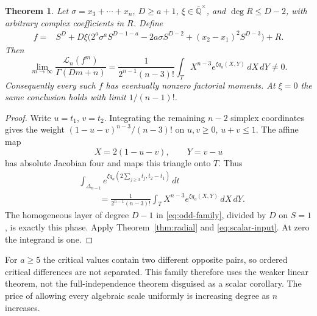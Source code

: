 \documentclass[11pt]{article}
\numberwithin{equation}{section}
\newtheorem{theorem}{Theorem}[section]
\theoremstyle{definition}
\theoremstyle{remark}
\newcommand{\Qbar}{\overline{\mathbb Q}}
\newcommand{\Lcal}{\mathcal L}
\begin{document}
\begin{theorem}\label{thm:odd-family}
Let $\sigma=x_3+\cdots+x_n$, $D\ge a+1$, $\xi\in\Qbar^\times$, and
$\deg R\le D-2$, with arbitrary complex coefficients in $R$. Define
\begin{align}\label{eq:odd-family}
 f={}&S^D+D\xi\bigl(
 2^a\sigma^a S^{D-1-a}
 -2a\sigma S^{D-2}
 +(x_2-x_1)^2 S^{D-3}\bigr)+R.
\end{align}
Then
\[
 \lim_{m\to\infty}\frac{\Lcal_n(f^m)}{\Gamma(Dm+n)}
 =\frac{1}{2^{n-1}(n-3)!}
   \int_T X^{n-3}e^{\xi q_a(X,Y)}\,dX\,dY\ne0.
\]
Consequently every such $f$ has eventually nonzero factorial moments.
At $\xi=0$ the same conclusion holds with limit $1/(n-1)!$.
\end{theorem}
\begin{proof}
Write $u=t_1$, $v=t_2$. Integrating the remaining $n-2$ simplex coordinates
gives the weight $(1-u-v)^{n-3}/(n-3)!$ on
$u,v\ge0$, $u+v\le1$. The affine map
\[
 X=2(1-u-v),\qquad Y=v-u
\]
has absolute Jacobian four and maps this triangle onto $T$. Thus
\begin{align*}
 &\int_{\Delta_{n-1}}
   e^{\xi q_a(2\sum_{j\ge3}t_j,t_2-t_1)}\,dt\\
 &\hspace{1cm}=
 \frac{1}{2^{n-1}(n-3)!}\int_T X^{n-3}e^{\xi q_a(X,Y)}\,dX\,dY.
\end{align*}
The homogeneous layer of degree $D-1$ in \eqref{eq:odd-family}, divided by
$D$ on $S=1$, is exactly this phase. Apply Theorem~\ref{thm:radial} and
\eqref{eq:scalar-input}. At zero the integrand is one.
\end{proof}

For $a\ge5$ the critical values contain two different opposite pairs,
so ordered critical differences are not separated. This family therefore
uses the weaker linear theorem, not the full-independence theorem disguised
as a scalar corollary. The price of allowing every algebraic scale uniformly
is increasing degree as $n$ increases.
\end{document}
